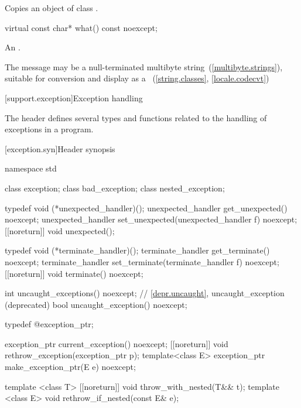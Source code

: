 \begin{itemdescr}
\pnum
\effects
Copies an object of class
.
\end{itemdescr}

%
\begin{itemdecl}
virtual const char* what() const noexcept;
\end{itemdecl}

\begin{itemdescr}
\pnum
\returns
An  \ntbs.%

\pnum
\remarks
The message may be a null-terminated multibyte string~(\ref{multibyte.strings}),
suitable for conversion and display as a
~(\ref{string.classes}, \ref{locale.codecvt})
\end{itemdescr}

[support.exception]{Exception handling}

\pnum
The header
defines several types and functions related to the handling of exceptions in a \Cpp program.

[exception.syn]{Header  synopsis}
%
%

\begin{codeblock}
namespace std {
  class exception;
  class bad_exception;
  class nested_exception;

  typedef void (*unexpected_handler)();
  unexpected_handler get_unexpected() noexcept;
  unexpected_handler set_unexpected(unexpected_handler f) noexcept;
  [[noreturn]] void unexpected();

  typedef void (*terminate_handler)();
  terminate_handler get_terminate() noexcept;
  terminate_handler set_terminate(terminate_handler f) noexcept;
  [[noreturn]] void terminate() noexcept;

  int uncaught_exceptions() noexcept;
  // \ref{depr.uncaught}, uncaught_exception (deprecated)
  bool uncaught_exception() noexcept;

  typedef @\unspec@ exception_ptr;

  exception_ptr current_exception() noexcept;
  [[noreturn]] void rethrow_exception(exception_ptr p);
  template<class E> exception_ptr make_exception_ptr(E e) noexcept;

  template <class T> [[noreturn]] void throw_with_nested(T&& t);
  template <class E> void rethrow_if_nested(const E& e);
}
\end{codeblock}

